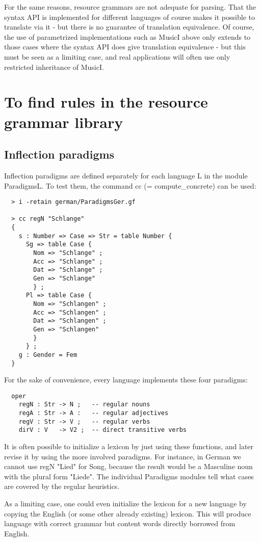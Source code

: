 \documentclass[11pt,a4paper]{article}
\begin{document}
For the same reasons, resource grammars are not adequate for parsing.
That the syntax API is implemented for different languages of course makes
it possible to translate via it - but there is no guarantee of translation
equivalence. Of course, the use of parametrized implementations such as MusicI
above only extends to those cases where the syntax API does give translation
equivalence - but this must be seen as a limiting case, and real applications
will often use only restricted inheritance of MusicI.

\section{To find rules in the resource grammar library}
\subsection{Inflection paradigms}
Inflection paradigms are defined separately for each language L
in the module ParadigmsL. To test them, the command cc (= compute\_concrete)
can be used:

\begin{verbatim}
  > i -retain german/ParadigmsGer.gf

  > cc regN "Schlange"
  {
    s : Number => Case => Str = table Number {
      Sg => table Case {
        Nom => "Schlange" ;
        Acc => "Schlange" ;
        Dat => "Schlange" ;
        Gen => "Schlange"
        } ;
      Pl => table Case {
        Nom => "Schlangen" ;
        Acc => "Schlangen" ;
        Dat => "Schlangen" ;
        Gen => "Schlangen"
        }
      } ;
    g : Gender = Fem
  }
\end{verbatim}
For the sake of convenience, every language implements these four paradigms:

\begin{verbatim}
  oper
    regN : Str -> N ;   -- regular nouns
    regA : Str -> A :   -- regular adjectives
    regV : Str -> V ;   -- regular verbs
    dirV : V   -> V2 ;  -- direct transitive verbs
\end{verbatim}
It is often possible to initialize a lexicon by just using these functions,
and later revise it by using the more involved paradigms. For instance, in
German we cannot use regN "Lied" for Song, because the result would be a
Masculine noun with the plural form "Liede". The individual Paradigms modules
tell what cases are covered by the regular heuristics.

As a limiting case, one could even initialize the lexicon for a new language
by copying the English (or some other already existing) lexicon. This will
produce language with correct grammar but content words directly borrowed from
English.
\end{document}
